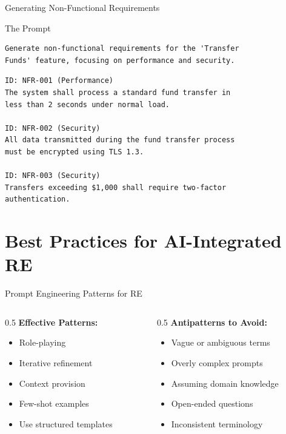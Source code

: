 \documentclass{beamer}
\begin{document}
\begin{frame}[fragile]{Generating Non-Functional Requirements}
    \begin{block}{The Prompt}
        \lstset{style=code}
        \begin{lstlisting}
Generate non-functional requirements for the 'Transfer
Funds' feature, focusing on performance and security.
        \end{lstlisting}
    \end{block}
    \lstset{style=code}
    \begin{lstlisting}[caption={Non-Functional Requirements}]
ID: NFR-001 (Performance)
The system shall process a standard fund transfer in 
less than 2 seconds under normal load.

ID: NFR-002 (Security)
All data transmitted during the fund transfer process 
must be encrypted using TLS 1.3.

ID: NFR-003 (Security)
Transfers exceeding $1,000 shall require two-factor 
authentication.
    \end{lstlisting}
\end{frame}

\section{Best Practices for AI-Integrated RE}

\begin{frame}[t]{Prompt Engineering Patterns for RE}
    \begin{columns}
        \begin{column}{0.5\textwidth}
            \textbf{Effective Patterns:}
            \begin{itemize}
                \item Role-playing
                \item Iterative refinement
                \item Context provision
                \item Few-shot examples
                \item Use structured templates
            \end{itemize}
        \end{column}
        \begin{column}{0.5\textwidth}
            \textbf{Antipatterns to Avoid:}
            \begin{itemize}
                \item Vague or ambiguous terms
                \item Overly complex prompts
                \item Assuming domain knowledge
                \item Open-ended questions
                \item Inconsistent terminology
            \end{itemize}
        \end{column}
    \end{columns}
\end{frame}
\end{document}
